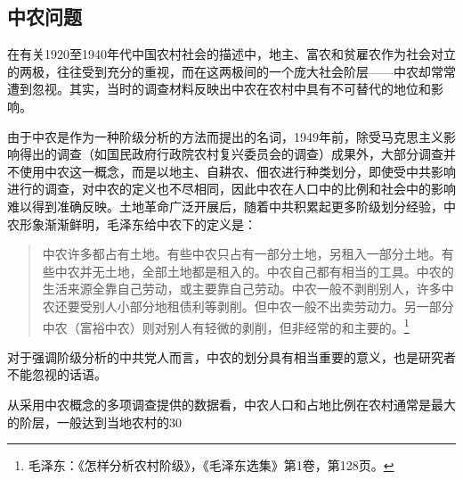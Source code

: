 \subsection{中农问题}


在有关1920至1940年代中国农村社会的描述中，地主、富农和贫雇农作为社会对立的两极，往往受到充分的重视，而在这两极间的一个庞大社会阶层——中农却常常遭到忽视。其实，当时的调查材料反映出中农在农村中具有不可替代的地位和影响。


由于中农是作为一种阶级分析的方法而提出的名词，1949年前，除受马克思主义影响得出的调查（如国民政府行政院农村复兴委员会的调查）成果外，大部分调查并不使用中农这一概念，而是以地主、自耕农、佃农进行种类划分，即使受中共影响进行的调查，对中农的定义也不尽相同，因此中农在人口中的比例和社会中的影响难以得到准确反映。土地革命广泛开展后，随着中共积累起更多阶级划分经验，中农形象渐渐鲜明，毛泽东给中农下的定义是：

\begin{quote}

中农许多都占有土地。有些中农只占有一部分土地，另租入一部分土地。有些中农并无土地，全部土地都是租入的。中农自己都有相当的工具。中农的生活来源全靠自己劳动，或主要靠自己劳动。中农一般不剥削别人，许多中农还要受别人小部分地租债利等剥削。但中农一般不出卖劳动力。另一部分中农（富裕中农）则对别人有轻微的剥削，但非经常的和主要的。\footnote{毛泽东：《怎样分析农村阶级》，《毛泽东选集》第1卷，第128页。}
\end{quote}


对于强调阶级分析的中共党人而言，中农的划分具有相当重要的意义，也是研究者不能忽视的话语。


从采用中农概念的多项调查提供的数据看，中农人口和占地比例在农村通常是最大的阶层，一般达到当地农村的30%


